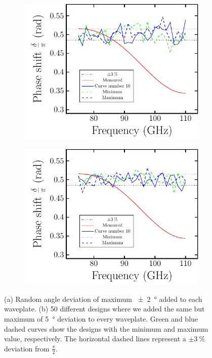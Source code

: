 \begin{figure}[H]
    \begin{subfigure}[b]{.5\linewidth}
    \caption{}\label{}
    \centering\includegraphics[scale=0.65]{images/results/plots/polymer/dimension_errors/delta_angle_error_a.pdf}
    \end{subfigure}%
    \begin{subfigure}[b]{.5\linewidth}
    \caption{}\label{}
    \centering\includegraphics[scale=0.65]{images/results/plots/polymer/dimension_errors/delta_angle_error_b.pdf}
    \end{subfigure}
    \caption{(a) Random angle deviation of maximum \SI{\pm2}{\degree} added to each waveplate. (b) 50 different designs where we added the same but maximum of \SI{5}{\degree} deviation to every waveplate. Green and blue dashed curves show the designs with the minimum and maximum value, respectively. The horizontal dashed lines represent a $\pm \SI{3}{\percent}$ deviation from $\frac{\pi}{2}$.}
    \label{fig:delta_angle_err}
\end{figure}

